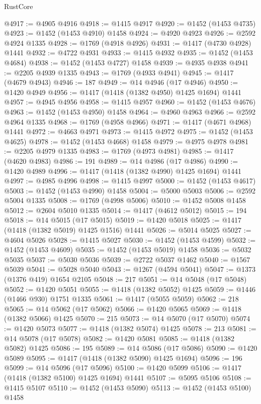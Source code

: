 \begin{lexlean}{RustCore}
\begin{coremodule}
@4917 := @4905 @4916
@4918 := @1415 @4917
@4920 := @1452 (@1453 @4735)
@4923 := @1452 (@1453 @4910) @1458
@4924 := @4920 @4923
@4926 := @2592 @4924 @1335
@4928 := @1769 (@4918 @4926)
@4931 := @1417 (@4730 @4928) @1441
@4932 := @4722 @4931
@4933 := @1415 @4932
@4935 := @1452 (@1453 @4684)
@4938 := @1452 (@1453 @4727) @1458
@4939 := @4935 @4938
@4941 := @2205 @4939 @1335
@4943 := @1769 (@4933 @4941)
@4945 := @1417 (@4679 @4943)
@4946 := 187
@4949 := @14 @4946 (@17 @4946)
@4950 := @1420 @4949
@4956 := @1417 (@1418 (@1382 @4950) @1425 @1694) @1441
@4957 := @4945 @4956
@4958 := @1415 @4957
@4960 := @1452 (@1453 @4676)
@4963 := @1452 (@1453 @4950) @1458
@4964 := @4960 @4963
@4966 := @2592 @4964 @1335
@4968 := @1769 (@4958 @4966)
@4971 := @1417 (@4671 @4968) @1441
@4972 := @4663 @4971
@4973 := @1415 @4972
@4975 := @1452 (@1453 @4625)
@4978 := @1452 (@1453 @4668) @1458
@4979 := @4975 @4978
@4981 := @2205 @4979 @1335
@4983 := @1769 (@4973 @4981)
@4985 := @1417 (@4620 @4983)
@4986 := 191
@4989 := @14 @4986 (@17 @4986)
@4990 := @1420 @4989
@4996 := @1417 (@1418 (@1382 @4990) @1425 @1694) @1441
@4997 := @4985 @4996
@4998 := @1415 @4997
@5000 := @1452 (@1453 @4617)
@5003 := @1452 (@1453 @4990) @1458
@5004 := @5000 @5003
@5006 := @2592 @5004 @1335
@5008 := @1769 (@4998 @5006)
@5010 := @1452 @5008 @1458
@5012 := @2604 @5010 @1335
@5014 := @1417 (@4612 @5012)
@5015 := 194
@5018 := @14 @5015 (@17 @5015)
@5019 := @1420 @5018
@5025 := @1417 (@1418 (@1382 @5019) @1425 @1516) @1441
@5026 := @5014 @5025
@5027 := @4604 @5026
@5028 := @1415 @5027
@5030 := @1452 (@1453 @4599)
@5032 := @1452 (@1453 @4609)
@5035 := @1452 (@1453 @5019) @1458
@5036 := @5032 @5035
@5037 := @5030 @5036
@5039 := @2722 @5037 @1462
@5040 := @1567 @5039
@5041 := @5028 @5040
@5043 := @1267 (@4594 @5041)
@5047 := @1373 (@1376 @419) @1654 @2105
@5048 := 217
@5051 := @14 @5048 (@17 @5048)
@5052 := @1420 @5051
@5055 := @1418 (@1382 @5052) @1425
@5059 := @1446 (@1466 @930) @1751 @1335
@5061 := @1417 (@5055 @5059)
@5062 := 218
@5065 := @14 @5062 (@17 @5062)
@5066 := @1420 @5065
@5069 := @1418 (@1382 @5066) @1425
@5070 := 215
@5073 := @14 @5070 (@17 @5070)
@5074 := @1420 @5073
@5077 := @1418 (@1382 @5074) @1425
@5078 := 213
@5081 := @14 @5078 (@17 @5078)
@5082 := @1420 @5081
@5085 := @1418 (@1382 @5082) @1425
@5086 := 195
@5089 := @14 @5086 (@17 @5086)
@5090 := @1420 @5089
@5095 := @1417 (@1418 (@1382 @5090) @1425 @1694)
@5096 := 196
@5099 := @14 @5096 (@17 @5096)
@5100 := @1420 @5099
@5106 := @1417 (@1418 (@1382 @5100) @1425 @1694) @1441
@5107 := @5095 @5106
@5108 := @1415 @5107
@5110 := @1452 (@1453 @5090)
@5113 := @1452 (@1453 @5100) @1458

\end{coremodule}
\end{lexlean}
